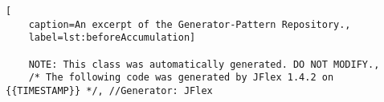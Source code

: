 
\begin{lstlisting}[
	caption=An excerpt of the Generator-Pattern Repository.,
	label=lst:beforeAccumulation]
	
	NOTE: This class was automatically generated. DO NOT MODIFY.,
	/* The following code was generated by JFlex 1.4.2 on {{TIMESTAMP}} */, //Generator: JFlex
	
	
	
\end{lstlisting}